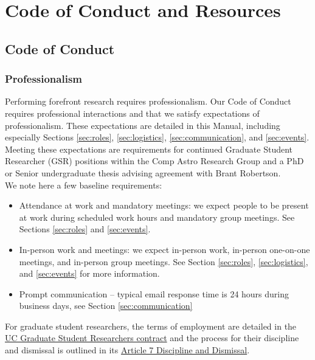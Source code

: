 \section{Code of Conduct and Resources}
\label{sec:code_of_conduct}

\subsection{Code of Conduct}

\subsubsection{Professionalism}

Performing forefront research requires professionalism. Our Code of Conduct requires professional interactions and that we satisfy expectations of professionalism. These expectations are detailed in this Manual, including especially Sections \ref{sec:roles}, \ref{sec:logistics}, \ref{sec:communication}, and \ref{sec:events}. Meeting these expectations
are requirements for continued Graduate Student Researcher (GSR) positions within the Comp Astro Research Group
and a PhD or Senior undergraduate thesis advising agreement with Brant Robertson.\\

\noindent
We note here a few baseline requirements:

\begin{itemize}
	\item Attendance at work and mandatory meetings: we expect people to be present at work during scheduled work hours and mandatory group meetings. See Sections \ref{sec:roles} and \ref{sec:events}.
	\item In-person work and meetings: we expect in-person work, in-person one-on-one meetings, and in-person group meetings. See Section \ref{sec:roles}, \ref{sec:logistics}, and \ref{sec:events} for more information.
	\item Prompt communication -- typical email response time is 24 hours during business days, see Section \ref{sec:communication}
\end{itemize}

\noindent
For graduate student researchers, the terms of employment are detailed in the \href{https://ucnet.universityofcalifornia.edu/resources/employment-policies-contracts/bargaining-units/graduate-student-researchers/contract/}{UC Graduate Student Researchers contract} and the
process for their discipline and dismissal is outlined in its \href{https://qa.ucnet.universityofcalifornia.edu/labor/bargaining-units/br/docs/br_07_discipline-and-dismissal_20225-2025.pdf}{Article 7 Discipline and Dismissal}.\\

